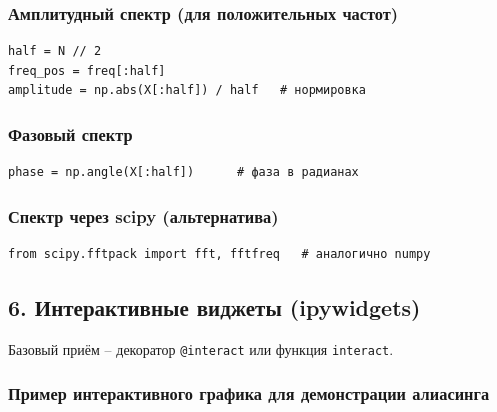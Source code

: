 \documentclass[12pt,a4paper,openany]{book}
\begin{document}
\subsubsection*{Амплитудный спектр (для положительных частот)}

\begin{Verbatim}[fontsize=\small, breaklines, breakanywhere]
half = N // 2
freq_pos = freq[:half]
amplitude = np.abs(X[:half]) / half   # нормировка
\end{Verbatim}

\subsubsection*{Фазовый спектр}

\begin{Verbatim}[fontsize=\small, breaklines, breakanywhere]
phase = np.angle(X[:half])      # фаза в радианах
\end{Verbatim}

\subsubsection*{Спектр через scipy (альтернатива)}

\begin{Verbatim}[fontsize=\small, breaklines, breakanywhere]
from scipy.fftpack import fft, fftfreq   # аналогично numpy
\end{Verbatim}

\subsection*{6. Интерактивные виджеты (ipywidgets)}

Базовый приём -- декоратор \texttt{@interact} или функция \texttt{interact}.

\subsubsection*{Пример интерактивного графика для демонстрации алиасинга}
\end{document}
